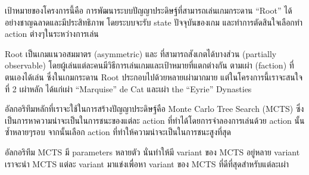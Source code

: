 \maketitle
\makesignature

\ifproject
\begin{abstractTH}
เป้าหมายของโครงการนี้คือ การพัฒนาระบบปัญญาประดิษฐ์ที่สามารถเล่นเกมกระดาน ``Root'' ได้อย่างชาญฉลาดและมีประสิทธิภาพ โดยระบบจะรับ state ปัจจุบันของเกม และทำการตัดสินใจเลือกทำ action ต่างๆในระหว่างการเล่น

Root เป็นเกมแนวอสมมาตร (asymmetric) และ  ที่สามารถสังเกตได้บางส่วน (partially observable) โดยผู้เล่นแต่ละคนมีวิธีการเล่นเกมและเป้าหมายที่แตกต่างกัน ตามเผ่า (faction) ที่ตนเองได้เล่น ซึ่งในเกมกระดาน Root ประกอบไปด้วยหลายเผ่ามากมาย แต่ในโครงการนี้เราจะสนใจที่ 2 เผ่าหลัก ได้แก่เผ่า ``Marquise'' de Cat และเผ่า the ``Eyrie'' Dynasties

อัลกอริทึมหลักที่เราจะใช้ในการสร้างปัญญาประดิษฐ์คือ Monte Carlo Tree Search (MCTS) ซึ่งเป็นการหาความน่าจะเป็นในการชนะของแต่ละ action ที่ทำได้โดยการจำลองการเล่นด้วย action นั้นซ้ำหลายๆรอบ จากนั้นเลือก action ที่ทำให้ความน่าจะเป็นในการชนะสูงที่สุด

อัลกอริทึม MCTS มี parameters หลายตัว นั่นทำให้มี variant ของ MCTS อยู่หลาย variant เราจะนำ MCTS แต่ละ variant มาแข่งเพื่อหา variant ของ MCTS ที่ดีที่สุดสำหรับแต่ละเผ่า


\end{abstractTH}

